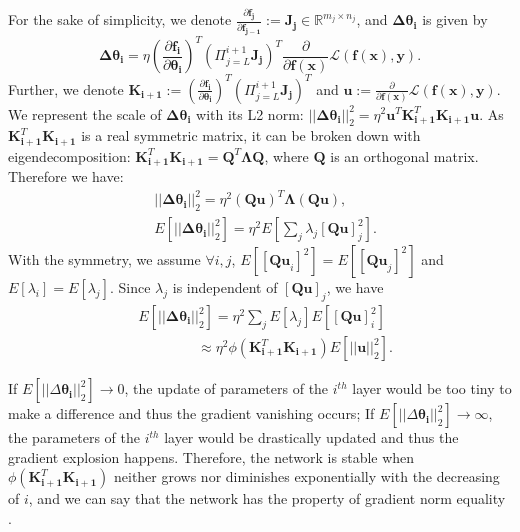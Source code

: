 \documentclass[10pt,journal,compsoc]{IEEEtran}
\begin{document}
For the sake of simplicity, we denote $\frac{\partial \mathbf{f_{j}}}{\partial \mathbf{f_{j-1}}} := \mathbf{J_j}\in \mathbb{R}^{m_j\times n_j}$, and $\mathbf{\Delta \theta_i}$ is given by
\begin{equation}
    \mathbf{\Delta \theta_i} = \eta \left(\frac{\partial \mathbf{f_{i}}}{\partial \mathbf{\theta_{i}}}\right)^T\left(\Pi_{j=L}^{i+1}\mathbf{J_j}\right)^T \frac{\partial}{\partial \mathbf{f}(\mathbf{x})}\mathcal{L}(\mathbf{f}(\mathbf{x}), \mathbf{y}).
\end{equation}
Further, we denote $\mathbf{K_{i+1}}:=\left(\frac{\partial \mathbf{f_{i}}}{\partial \mathbf{\theta_{i}}}\right)^T\left(\Pi_{j=L}^{i+1}\mathbf{J_j}\right)^T$ and $\mathbf{u}:=\frac{\partial}{\partial \mathbf{f}(\mathbf{x})}\mathcal{L}(\mathbf{f}(\mathbf{x}), \mathbf{y})$. We represent the scale of $\mathbf{\Delta\theta_i}$ with its L2 norm: $|| \mathbf{\Delta\theta_i}||_2^2=\eta^2\mathbf{u}^T\mathbf{K}^T_{\mathbf{i+1}}\mathbf{K}_{\mathbf{i+1}} \mathbf{u}$. As $\mathbf{K}^T_{\mathbf{i+1}}\mathbf{K_{i+1}}$ is a real symmetric matrix, it can be broken down with eigendecomposition: $\mathbf{K}^T_{\mathbf{i+1}}\mathbf{K_{i+1}} = \mathbf{Q}^T\mathbf{\Lambda Q}$, where $\mathbf{Q}$ is an orthogonal matrix. Therefore we have: 
\begin{equation}
\begin{split}
    & ||\mathbf{\Delta\theta_i}||_2^2 = \eta^2(\mathbf{Qu})^T\mathbf{\Lambda}(\mathbf{Qu}),\\
    & E\left[||\mathbf{\Delta\theta_i}||_2^2\right] = \eta^2E\left[\sum_j\lambda_j[\mathbf{Qu}]_j^2\right].
\end{split}
\end{equation}
With the symmetry, we assume $\forall i,j$, $E[[\mathbf{Qu}_i]^2]=E[[\mathbf{Qu}_j]^2]$ and $E[\lambda_i]=E[\lambda_j]$. Since $\lambda_j$ is independent of $[\mathbf{Qu}]_j$, we have
\begin{equation}
\begin{split}
    & E\left[||\mathbf{\Delta\theta_i}||_2^2\right] =  \eta^2\sum_jE[\lambda_j]E\left[[\mathbf{Qu}]_i^2\right]\\
    &~~~~~~~~~~~~~~~~~~~\approx \eta^2\phi\left(\mathbf{K}^T_{\mathbf{i+1}}\mathbf{K_{i+1}}\right)E\left[||\mathbf{u}||_2^2\right].
\end{split}
\label{equ:backward_expect_l2_norm}
\end{equation}

If $E[||\Delta \mathbf{\theta_i}||_2^2] \rightarrow 0$, the update of parameters of the $i^{th}$ layer would be too tiny to make a difference and thus the gradient vanishing occurs; If $E[||\Delta \mathbf{\theta_i}||_2^2]\rightarrow \infty$, the parameters of the $i^{th}$ layer would be drastically updated and thus the gradient explosion happens. Therefore, the network is stable when $\phi\left(\mathbf{K}^T_{\mathbf{i+1}}\mathbf{K_{i+1}}\right)$ neither grows nor diminishes exponentially with the decreasing of $i$, and we can say that the network has the property of gradient norm equality \cite{arpit2019benefits}.
\vspace{-10pt}
\end{document}
